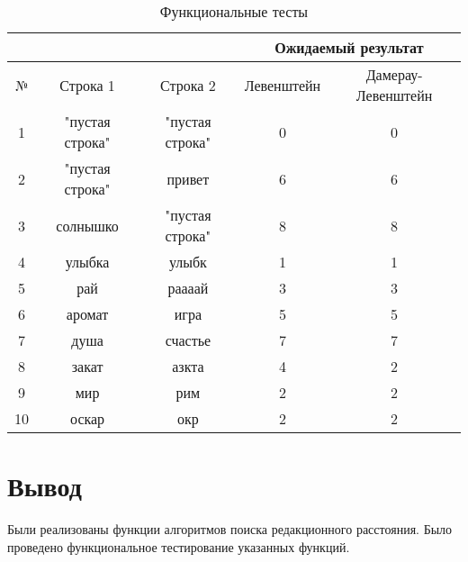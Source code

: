 \begin{table}[h]
	\begin{center}
        \begin{threeparttable}
        \captionsetup{justification=raggedright,singlelinecheck=off}
		\caption{\label{tbl:func_test} Функциональные тесты}
		\begin{tabular}{|c|c|c|c|c|}
			\hline
			& & & \multicolumn{2}{c|}{Ожидаемый результат} \\
			\hline
			№&Строка 1&Строка 2&Левенштейн&Дамерау-Левенштейн\\
			\hline
            1&"пустая строка"&"пустая строка"&0&0 \\
            \hline
            2&"пустая строка"&привет&6&6 \\
            \hline
            3&солнышко&"пустая строка"&8&8 \\
            \hline
            4&улыбка&улыбк&1&1 \\
			\hline
			5&рай&раааай&3&3 \\
			\hline
            6&аромат&игра&5&5 \\
			\hline
			7&душа&счастье&7&7 \\
			\hline
			8&закат&азкта&4&2 \\
			\hline
			9&мир&рим&2&2 \\
			\hline
			10&оскар&окр&2&2 \\
			\hline
		\end{tabular}
        \end{threeparttable}
	\end{center}
\end{table}


\section{Вывод}

Были реализованы функции алгоритмов поиска редакционного расстояния. Было проведено функциональное тестирование указанных функций.
